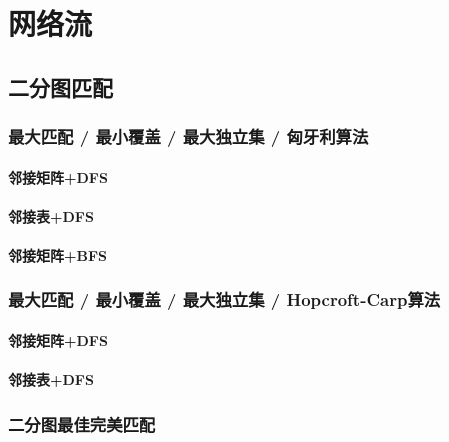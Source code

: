 
\chapter{网络流}
\label{network}



\section{二分图匹配}

\subsection{最大匹配 / 最小覆盖 / 最大独立集 / 匈牙利算法}
\subsubsection{邻接矩阵+DFS}


\subsubsection{邻接表+DFS}


\subsubsection{邻接矩阵+BFS}


\subsection{最大匹配 / 最小覆盖 / 最大独立集 / Hopcroft-Carp算法}
\subsubsection{邻接矩阵+DFS}


\subsubsection{邻接表+DFS}


\subsection{二分图最佳完美匹配}


